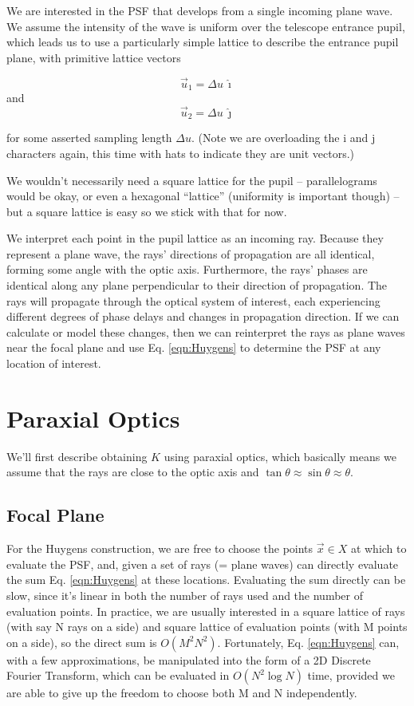 \documentclass{article}
\begin{document}
We are interested in the PSF that develops from a single incoming plane wave.  We assume the
intensity of the wave is uniform over the telescope entrance pupil, which leads us to use a
particularly simple lattice to describe the entrance pupil plane, with primitive lattice vectors

\begin{equation}
    \vec{u}_1 = \Delta u \, \hat{\imath}
\end{equation}
and
\begin{equation}
    \vec{u}_2 = \Delta u \, \hat{\jmath}
\end{equation}

for some asserted sampling length $\Delta u$. (Note we are overloading the i and j characters again,
this time with hats to indicate they are unit vectors.)

We wouldn't necessarily need a square lattice for the pupil -- parallelograms would be okay, or even
a hexagonal ``lattice'' (uniformity is important though) --  but a square lattice is easy so we
stick with that for now.

We interpret each point in the pupil lattice as an incoming ray.  Because they represent a plane
wave, the rays' directions of propagation are all identical, forming some angle with the optic axis.
Furthermore, the rays' phases are identical along any plane perpendicular to their direction of
propagation.  The rays will propagate through the optical system of interest, each experiencing
different degrees of phase delays and changes in propagation direction.  If we can calculate or
model these changes, then we can reinterpret the rays as plane waves near the focal plane and use
Eq. \ref{eqn:Huygens} to determine the PSF at any location of interest.

\section{Paraxial Optics}

We'll first describe obtaining $K$ using paraxial optics, which basically means we assume that the
rays are close to the optic axis and $\tan \theta \approx \sin \theta \approx \theta$.

\subsection{Focal Plane}

For the Huygens construction, we are free to choose the points $\vec{x} \in X$ at which to evaluate
the PSF, and, given a set of rays (= plane waves) can directly evaluate the sum Eq.
\ref{eqn:Huygens} at these locations.  Evaluating the sum directly can be slow, since it's linear in
both the number of rays used and the number of evaluation points.  In practice, we are usually
interested in a square lattice of rays (with say N rays on a side) and square lattice of evaluation
points (with M points on a side), so the direct sum is $O(M^2 N^2)$.  Fortunately, Eq.
\ref{eqn:Huygens} can, with a few approximations, be manipulated into the form of a 2D Discrete
Fourier Transform, which can be evaluated in $O(N^2 \log N)$ time, provided we are able to give up
the freedom to choose both M and N independently.
\end{document}
